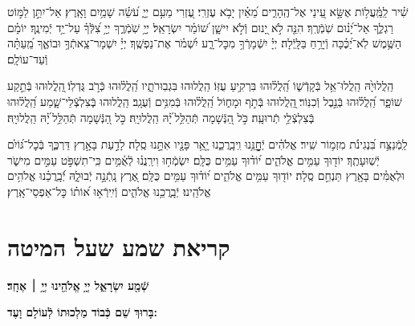 \documentclass[twoside, openany, parskip=half, 11pt]{book}
\begin{document}
שִׁ֗יר לַֽמַּֽ֫עֲל֥וֹת אֶשָּׂ֣א עֵ֭ינַי אֶל־הֶֽהָרִ֑ים מֵ֝אַ֗יִן יָבֹ֥א עֶזְרִֽי׃ עֶ֭זְרִי מֵעִ֣ם יְיָ֑ עֹ֝שֵׂ֗ה שָׁמַ֥יִם וָאָֽרֶץ׃ אַל־יִתֵּ֣ן לַמּ֣וֹט רַגְלֶ֑ךָ אַל־יָ֝נ֗וּם שֹֽׁמְֿרֶֽךָ׃ הִנֵּ֤ה לֹ֣א יָ֭נוּם וְֿלֹ֣א יִישָׁ֑ן שׁ֝וֹמֵ֗ר יִשְׂרָאֵֽל׃ יְיָ֥ שֹֽׁמְֿרֶ֑ךָ יְיָ֥ צִ֝לְּֿךָ֗ עַל־יַ֥ד יְֿמִינֶֽךָ׃ יוֹמָ֗ם הַשֶּׁ֥מֶשׁ לֹֽא־יַ֝כֶּ֗כָּה וְֿיָרֵ֥חַ בַּלָּֽיְֿלָה׃ יְיָ֗ יִשְֿׁמָרְֿךָ֥ מִכׇּל־רָ֑ע יִ֝שְׁמֹ֗ר אֶת־נַפְשֶֽׁךָ׃ יְיָ֗ יִשְׁמָר־צֵֽאתְֿךָ֥ וּבוֹאֶ֑ךָ מֵֽ֝עַתָּ֗ה וְֿעַד־עוֹלָֽם׃

הַֽלֲלוּיָ֙הּ הַֽלֲלוּ־אֵ֥ל בְּֿקָדְֿשׁ֑וֹ הַֽ֝לֲל֗וּהוּ בִּרְקִ֥יעַ עֻזּֽוֹ׃
הַֽלֲלוּהוּ בִּגְבֽוּרֹתָ֑יו הַֽ֝לֲל֗וּהוּ כְּֿרֹ֣ב גֻּדְלֽוֹ׃
֖הַֽלֲלוּהוּ בְּֿתֵ֣קַע שׁוֹפָ֑ר הַֽ֝לֲל֗וּהוּ בְּֿנֵ֣בֶל וְֿכִנּֽוֹר׃
֖הַֽלֲלוּהוּ בְּֿתֹ֣ף וּמָח֑וֹל הַֽ֝לֲל֗וּהוּ בְּֿמִנִּ֥ים וְֿעֻגָֽב׃
הַֽלֲלוּהוּ בְּֽֿצִלְצְֿלֵי־שָׁ֑מַע הַֽ֝לֲל֗וּהוּ בְּֽֿצִלְצְֿלֵ֥י תְֿרוּעָֽה׃
כֹּ֣ל הַ֭נְּֿשָׁמָה תְּֿהַלֵּ֥ל ֝יָ֗הּ הַֽלֲלוּיָֽהּ׃
כֹּ֣ל הַ֭נְּֿשָׁמָה תְּֿהַלֵּ֥ל ֝יָ֗הּ הַֽלֲלוּיָֽהּ׃

\enlargethispage{\baselineskip}
לַֽמְֿנַצֵּ֥ח
בִּ֝נְגִינֹ֗ת מִזְמ֥וֹר שִֽׁיר׃ אֱלֹהִ֗ים יְֿחׇׇׇׇׇׇׇׇָנֵּ֥נוּ וִֽיבָֽרֲכֵ֑נוּ יָ֤אֵ֥ר פָּנָ֖יו אִתָּ֣נוּ סֶֽלָה׃ לָדַ֣עַת בָּאָ֣רֶץ דַּרְכֶּ֑ךָ בְּֿכׇל־גּ֝וֹיִ֗ם יְֿשֽׁוּעָתֶֽךָ׃ יוֹד֖וּךָ עַמִּ֥ים אֱלֹהִ֑ים י֝וֹד֗וּךָ עַמִּ֥ים כֻּלָּֽם׃ יִשְׂמְֿח֥וּ וִירַֽנֲנ֗וּ לְֿאֻ֫מִּ֥ים כִּֽי־תִשְׁפֹּ֣ט עַמִּ֣ים מִישֹׁ֑ר וּלְאֻמִּ֓ים בָּאָ֖רֶץ תַּנְחֵ֣ם סֶֽלָה׃ יוֹד֖וּךָ עַמִּ֥ים אֱלֹהִ֑ים י֝וֹד֗וּךָ עַמִּ֥ים כֻּלָּֽם׃ אֶ֭רֶץ נָֽתְֿנָ֣ה יְֿבוּלָ֑הּ יְֿ֝בָֽרֲכֵ֗נוּ אֱלֹהִ֥ים אֱלֹהֵֽינוּ׃ יְֿבָֽרֲכֵ֥נוּ אֱלֹהִ֑ים וְֿיִֽירְֿא֥וּ א֝וֹת֗וֹ כׇּל־אַפְסֵי־אָֽרֶץ׃


\chapter[קריאת שמע שעל המיטה]{ קריאת שמע שעל המיטה }

\begin{Large}
	\textbf{
		שְֿׁמַ֖ע יִשְׂרָאֵ֑ל יְיָ֥ אֱלֹהֵ֖ינוּ יְיָ֥ ׀ אֶחָֽד׃} \\
\end{Large}
\begin{large}
	 \textbf{בָּרוּךְ שֵׁם כְּֿבוֹד מַלְכוּתוֹ לְֿעוֹלָם וָעֶד:}
\end{large}

\veahavta
\end{document}
